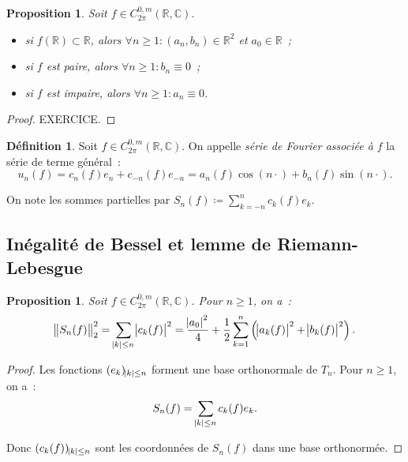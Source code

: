 \documentclass{report}
\newtheorem{prp}[thm]{Proposition}
\theoremstyle{definition}
\newtheorem{déf}[thm]{Définition}
\theoremstyle{remark}
\numberwithin{equation}{section}
\newcommand{\C}{\mathbb C}
\newcommand{\R}{\mathbb R}
\newcommand{\CmT}[2]{C^{#1,m}_{#2}}
\newcommand{\CzmT}[1]{\CmT 0{#1}}
\newcommand{\Czm}{\CzmT{2\pi}}
\begin{document}
			\begin{prp} Soit $f \in \Czm(\R, \C)$.
			\begin{itemize}
				\item si $f(\R) \subset \R$, alors $\forall n \geq 1 : (a_n, b_n) \in \R^2$ et $a_0 \in \R$~;
				\item si $f$ est paire, alors $\forall n \geq 1 : b_n \equiv 0$~;
				\item si $f$ est impaire, alors $\forall n \geq 1 : a_n \equiv 0$.
			\end{itemize}
			\end{prp}

			\begin{proof} EXERCICE.
			\end{proof}

			\begin{déf} Soit $f \in \Czm(\R, \C)$. On appelle \textit{série de Fourier associée à $f$} la série de terme général~:
			\begin{equation}
				u_n(f) = c_n(f)e_n + c_{-n}(f)e_{-n} = a_n(f)\cos(n\cdot) + b_n(f)\sin(n\cdot).
			\end{equation}

			On note les sommes partielles par $S_n(f) \coloneqq \sum_{k=-n}^nc_k(f)e_k$.
			\end{déf}

		\subsection{Inégalité de Bessel et lemme de Riemann-Lebesgue}
			\begin{prp} Soit $f \in \Czm(\R, \C)$. Pour $n \geq 1$, on a~:
			\begin{equation}
				\norm {S_n(f)}_2^2 = \sum_{\abs k \leq n} \abs {c_k(f)}^2 = \frac {\abs {a_0}^2}4 + \frac 12\sum_{k=1}^n\left(\abs {a_k(f)}^2 + \abs {b_k(f)}^2\right).
			\end{equation}
			\end{prp}

			\begin{proof} Les fonctions $(e_k)_{\abs k \leq n}$ forment une base orthonormale de $T_n$. Pour $n \geq 1$, on a~:
			\begin{equation}
				S_n(f) = \sum_{\abs k \leq n}c_k(f)e_k.
			\end{equation}

			Donc $(c_k(f))_{\abs k \leq n}$ sont les coordonnées de $S_n(f)$ dans une base orthonormée.
			\end{proof}
\end{document}
